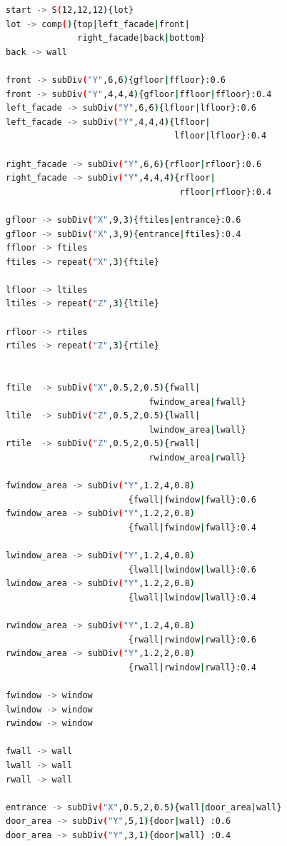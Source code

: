 \documentclass[a4paper, 11pt]{article}
\begin{document}
        \begin{center}
        \begin{lstlisting}[language=sh,caption=Conjunto de regras, frame=single, basicstyle=\ttfamily\small, captionpos=b]
start -> S(12,12,12){lot}
lot -> comp(){top|left_facade|front|
              right_facade|back|bottom}
back -> wall

front -> subDiv("Y",6,6){gfloor|ffloor}:0.6
front -> subDiv("Y",4,4,4){gfloor|ffloor|ffloor}:0.4
left_facade -> subDiv("Y",6,6){lfloor|lfloor}:0.6
left_facade -> subDiv("Y",4,4,4){lfloor|
                                 lfloor|lfloor}:0.4

right_facade -> subDiv("Y",6,6){rfloor|rfloor}:0.6
right_facade -> subDiv("Y",4,4,4){rfloor|
                                  rfloor|rfloor}:0.4

gfloor -> subDiv("X",9,3){ftiles|entrance}:0.6
gfloor -> subDiv("X",3,9){entrance|ftiles}:0.4
ffloor -> ftiles
ftiles -> repeat("X",3){ftile}

lfloor -> ltiles
ltiles -> repeat("Z",3){ltile}

rfloor -> rtiles
rtiles -> repeat("Z",3){rtile}


ftile  -> subDiv("X",0.5,2,0.5){fwall|
                            fwindow_area|fwall}
ltile  -> subDiv("Z",0.5,2,0.5){lwall|
                            lwindow_area|lwall}
rtile  -> subDiv("Z",0.5,2,0.5){rwall|
                            rwindow_area|rwall}

fwindow_area -> subDiv("Y",1.2,4,0.8)
                        {fwall|fwindow|fwall}:0.6
fwindow_area -> subDiv("Y",1.2,2,0.8)
                        {fwall|fwindow|fwall}:0.4

lwindow_area -> subDiv("Y",1.2,4,0.8)
                        {lwall|lwindow|lwall}:0.6
lwindow_area -> subDiv("Y",1.2,2,0.8)
                        {lwall|lwindow|lwall}:0.4

rwindow_area -> subDiv("Y",1.2,4,0.8)
                        {rwall|rwindow|rwall}:0.6
rwindow_area -> subDiv("Y",1.2,2,0.8)
                        {rwall|rwindow|rwall}:0.4

fwindow -> window
lwindow -> window
rwindow -> window

fwall -> wall
lwall -> wall
rwall -> wall

entrance -> subDiv("X",0.5,2,0.5){wall|door_area|wall}
door_area -> subDiv("Y",5,1){door|wall} :0.6
door_area -> subDiv("Y",3,1){door|wall} :0.4
        \end{lstlisting}
        \label{lst:testrules}
    \end{center}
\end{document}
